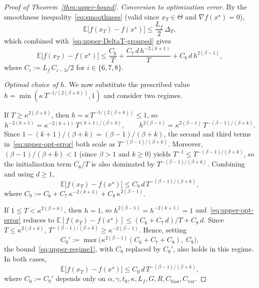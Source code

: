 \documentclass{article}
\renewcommand{\leq}{\leqslant}
\renewcommand{\geq}{\geqslant}
\theoremstyle{definition}
\begin{document}
\begin{proof}[Proof of Theorem~\ref{thm:upper-bound}]
\medskip
\noindent\textit{Conversion to optimization error.}
By the smoothness inequality~\eqref{eq:smoothness} (valid since 
$x_T\in\Theta$ and $\nabla f(x^\star)=0$),
\[
\mathbb{E}\bigl[f(x_T)-f(x^\star)\bigr]
\leq\frac{L_f}{2}\,\Delta_T,
\]
which combined with~\eqref{eq:upper-DeltaT-grouped} gives
\begin{equation}
\label{eq:upper-opt-error}
\mathbb{E}\bigl[f(x_T)-f(x^\star)\bigr]
\leq\frac{C_6}{T}+\frac{C_7\,d\,h^{-2(k+1)}}{T}
+C_8\,d\,h^{2(\beta-1)},
\end{equation}
where $C_i:=L_f\,C_{i-3}/2$ for $i\in\{6,7,8\}$.

\medskip
\noindent\textit{Optimal choice of $h$.}
We now substitute the prescribed value 
$h=\min(\kappa\,T^{-1/(2(\beta+k))},1)$ and consider two regimes.

If $T\geq\kappa^{2(\beta+k)}$, then 
$h=\kappa\,T^{-1/(2(\beta+k))}\leq 1$, so
\[
h^{-2(k+1)}=\kappa^{-2(k+1)}\,T^{(k+1)/(\beta+k)},
\qquad
h^{2(\beta-1)}=\kappa^{2(\beta-1)}\,T^{-(\beta-1)/(\beta+k)}.
\]
Since $1-(k+1)/(\beta+k)=(\beta-1)/(\beta+k)$, the second and 
third terms in~\eqref{eq:upper-opt-error} both scale as 
$T^{-(\beta-1)/(\beta+k)}$. Moreover, $(\beta-1)/(\beta+k)<1$ 
(since $\beta>1$ and $k\geq 0$) yields 
$T^{-1}\leq T^{-(\beta-1)/(\beta+k)}$, so the initialization term 
$C_6/T$ is also dominated by $T^{-(\beta-1)/(\beta+k)}$. Combining 
and using $d\geq 1$,
\begin{equation}
\label{eq:upper-regime1}
\mathbb{E}\bigl[f(x_T)-f(x^\star)\bigr]
\leq C_9\,d\,T^{-(\beta-1)/(\beta+k)},
\end{equation}
where 
$C_9:=C_6+C_7\,\kappa^{-2(k+1)}+C_8\,\kappa^{2(\beta-1)}$.

If $1\leq T<\kappa^{2(\beta+k)}$, then $h=1$, so 
$h^{2(\beta-1)}=h^{-2(k+1)}=1$ 
and~\eqref{eq:upper-opt-error} reduces to 
$\mathbb{E}[f(x_T)-f(x^\star)]\leq(C_6+C_7\,d)/T+C_8\,d$. Since 
$T\leq\kappa^{2(\beta+k)}$, 
$T^{-(\beta-1)/(\beta+k)}\geq\kappa^{-2(\beta-1)}$. Hence, setting
\[
C_9':=\max\bigl(\kappa^{2(\beta-1)}(C_6+C_7+C_8),\;C_9\bigr),
\]
the bound~\eqref{eq:upper-regime1}, with $C_9$ replaced by $C_9'$, 
also holds in this regime. In both cases,
\begin{equation}
\label{eq:upper-final-T}
\mathbb{E}\bigl[f(x_T)-f(x^\star)\bigr]
\leq C_0\,d\,T^{-(\beta-1)/(\beta+k)},
\end{equation}
where $C_0:=C_9'$ depends only on 
$\alpha,\gamma,t_0,\kappa,L_f,G,R,C_{\mathrm{bias}},C_{\mathrm{var}}$.


\end{proof}
\end{document}
